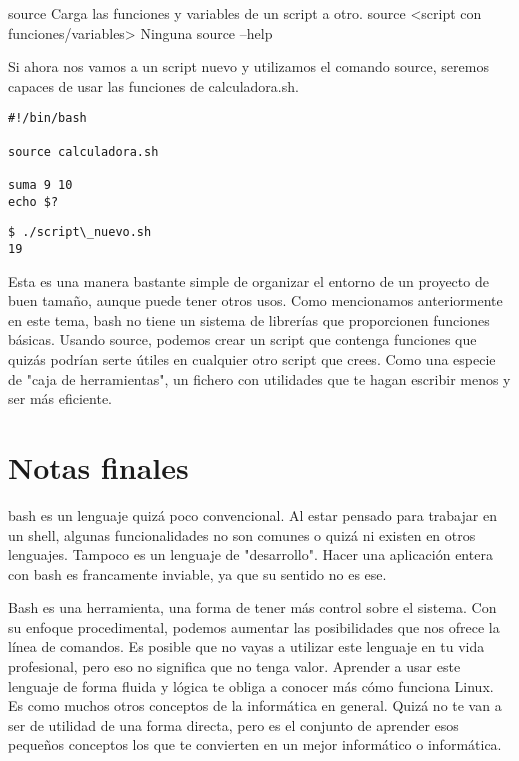 \begin{command-info}
{source}
{Carga las funciones y variables de un script a otro.}
{source <script con funciones/variables>}
{Ninguna}
{source --help}
\end{command-info}

Si ahora nos vamos a un script nuevo y utilizamos el comando source, seremos capaces de usar las funciones de calculadora.sh.

\begin{tcolorbox-code}
\begin{lstlisting}
#!/bin/bash

source calculadora.sh

suma 9 10
echo $?
\end{lstlisting}
\end{tcolorbox-code}

\begin{tcolorbox-code}
\begin{lstlisting}
$ ./script\_nuevo.sh
19
\end{lstlisting}
\end{tcolorbox-code}

Esta es una manera bastante simple de organizar el entorno de un proyecto de buen tamaño, aunque puede tener otros usos. Como mencionamos anteriormente en este tema, bash no tiene un sistema de librerías que proporcionen funciones básicas. Usando source, podemos crear un script que contenga funciones que quizás podrían serte útiles en cualquier otro script que crees. Como una especie de "caja de herramientas", un fichero con utilidades que te hagan escribir menos y ser más eficiente.

\section{Notas finales}
bash es un lenguaje quizá poco convencional. Al estar pensado para trabajar en un shell, algunas funcionalidades no son comunes o quizá ni existen en otros lenguajes. Tampoco es un lenguaje de "desarrollo". Hacer una aplicación entera con bash es francamente inviable, ya que su sentido no es ese. 

Bash es una herramienta, una forma de tener más control sobre el sistema. Con su enfoque procedimental, podemos aumentar las posibilidades que nos ofrece la línea de comandos. Es posible que no vayas a utilizar este lenguaje en tu vida profesional, pero eso no significa que no tenga valor. Aprender a usar este lenguaje de forma fluida y lógica te obliga a conocer más cómo funciona Linux. Es como muchos otros conceptos de la informática en general. Quizá no te van a ser de utilidad de una forma directa, pero es el conjunto de aprender esos pequeños conceptos los que te convierten en un mejor informático o informática. 

